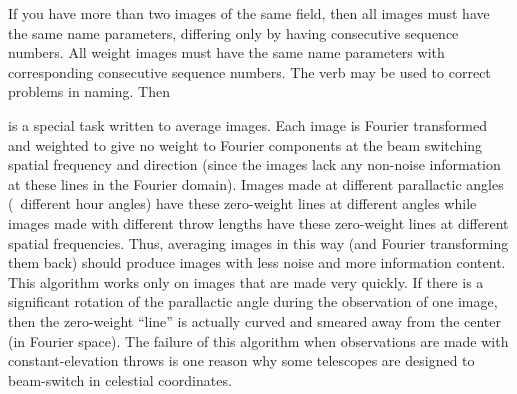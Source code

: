 If you have more than two images of the same field, then all images
must have the same name parameters, differing only by having
consecutive sequence numbers.  All weight images must have the same
name parameters with corresponding consecutive sequence numbers.  The
verb {\tt {}} may be used to correct problems in naming.
Then

     {\tt {}} is a special task written to average
 images.  Each image is Fourier
transformed and weighted to give no weight to Fourier components at
the beam switching spatial frequency and direction (since the images
lack any non-noise information at these lines in the Fourier domain).
Images made at different parallactic angles (\ie\ different hour
angles) have these zero-weight lines at different angles while images
made with different throw lengths have these zero-weight lines at
different spatial frequencies.  Thus, averaging images in this way
(and Fourier transforming them back) should produce images with less
noise and more information content.  This algorithm works only on
images that are made very quickly.  If there is a significant rotation
of the parallactic angle during the observation of one image, then the
zero-weight ``line'' is actually curved and smeared away from the
center (in Fourier space).  The failure of this algorithm when
observations are made with constant-elevation throws is one reason why
some telescopes are designed to beam-switch in celestial coordinates.

